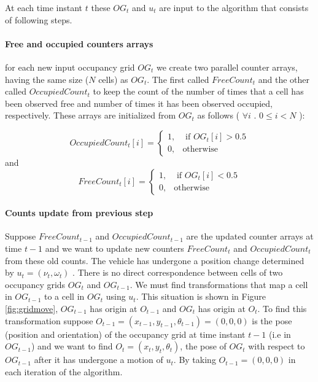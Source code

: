 At each time instant $t$ these $OG_t$ and $u_t$ are input to the algorithm that consists of 
following steps.

\paragraph{Free and occupied counters arrays} for each new input occupancy grid $OG_t$ we 
create two parallel counter arrays, having the same size ($N$ cells) as $OG_t$. The first called $FreeCount_t$ and the other called $OccupiedCount_t$ to keep the count of the number of times that a cell has been observed free and number of times it has been observed occupied, respectively. These arrays are initialized from $OG_t$ as follows ( $\forall i$  . $0 \leq i<N$ ):

\begin{equation}
OccupiedCount_t[i] =  \begin{cases} 1, & \mbox{ if $OG_t[i] > 0.5$} \\
                       0, & \mbox{otherwise} \end{cases}
\end{equation}
and
\begin{equation}
FreeCount_t[i] = \begin{cases} 1, & \mbox{ if $OG_t[i] < 0.5$} \\
                       0, & \mbox{otherwise} \end{cases}
\end{equation}

\paragraph{Counts update from previous step} Suppose $FreeCount_{t-1}$ and  $OccupiedCount_{t-1}$ are the
updated counter arrays at time $t-1$ and we want to update new counters $FreeCount_t$ and $OccupiedCount_t$
from these old counts. The vehicle has undergone a position change determined by $u_t=(\nu_t, \omega_t)$
. There is no direct correspondence between cells of two occupancy grids $OG_t$ and $OG_{t-1}$. We
must find transformations that map a cell in  $OG_{t-1}$ to a cell in $OG_{t}$ using $u_t$. This situation is
shown in Figure \ref{fig:gridmove}, $OG_{t-1}$ has origin at $O_{t-1}$ and $OG_t$ has origin at $O_t$. To find this transformation suppose $O_{t-1}=(x_{t-1}, y_{t-1}, \theta_{t-1}) = (0,0,0)$ is the pose (position and orientation) of the occupancy grid at time instant $t-1$ (i.e in $OG_{t-1}$) and we want to find $O_t=(x_t, y_t, \theta_t)$, the pose of $OG_t$ with respect to $OG_{t-1}$ after it has undergone a motion of $u_t$. By taking $O_{t-1}=(0,0,0)$ in each iteration of the algorithm.

